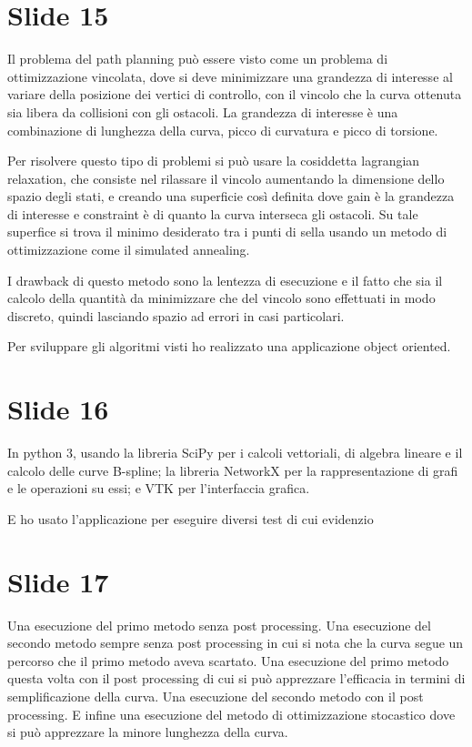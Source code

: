 \documentclass{article}
\begin{document}
\section*{Slide 15}
Il problema del path planning può essere visto come un problema di
ottimizzazione vincolata, dove si deve minimizzare una grandezza di
interesse al variare della
posizione dei vertici di controllo, con il vincolo che la curva
ottenuta sia libera da collisioni con gli ostacoli. La grandezza di
interesse è una 
combinazione di lunghezza della curva, picco di curvatura e picco di
torsione.

Per risolvere questo tipo di problemi si può usare la cosiddetta
lagrangian relaxation, che consiste nel rilassare il vincolo
aumentando la dimensione dello spazio degli stati, e creando una
superficie così definita dove gain è la grandezza di interesse e
constraint è di quanto la curva interseca gli ostacoli. Su tale
superfice si trova il minimo
desiderato tra i punti di sella usando un metodo di ottimizzazione
come il simulated annealing.

I drawback di questo metodo sono la lentezza di esecuzione e il fatto
che sia il calcolo della quantità da minimizzare che del vincolo sono
effettuati in modo discreto, quindi lasciando spazio ad errori in casi
particolari.

Per sviluppare gli algoritmi visti ho realizzato una applicazione
object oriented.

\section*{Slide 16}
In python 3, usando la libreria SciPy per i calcoli vettoriali, di algebra
lineare e il calcolo delle curve B-spline; la libreria NetworkX per la
rappresentazione di grafi e le operazioni su essi; e VTK per
l'interfaccia grafica.

E ho usato l'applicazione per eseguire diversi test di cui evidenzio

\section*{Slide 17}
Una esecuzione del primo metodo senza post processing. Una esecuzione
del secondo metodo sempre senza post processing in cui si nota che la
curva segue un percorso che il primo metodo aveva scartato. Una
esecuzione del primo metodo questa volta con il post processing di cui
si può apprezzare l'efficacia in termini di semplificazione della
curva. Una esecuzione del secondo metodo con il post processing. E
infine una esecuzione del metodo di ottimizzazione stocastico dove si
può apprezzare la minore lunghezza della curva.
\end{document}
